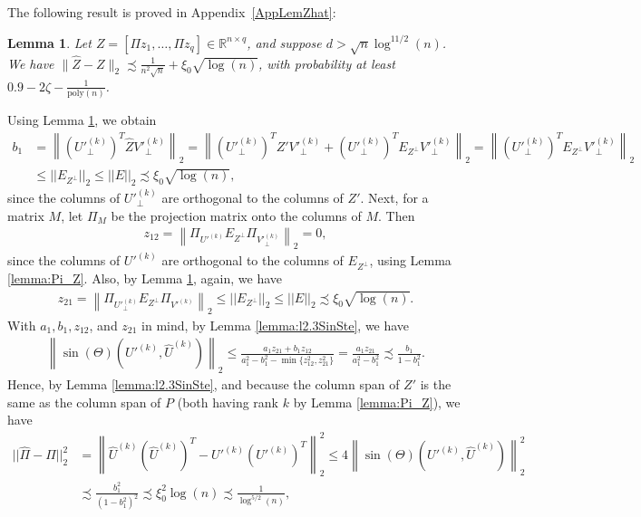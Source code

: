 \documentclass{article}
\newtheorem{lemma}{Lemma}
\begin{document}
The following result is proved in Appendix~\ref{AppLemZhat}: 

\begin{lemma}
\label{lemma:Zhat_Z}
Let $Z = [\Pi z_1, \dots, \Pi z_q] \in \mathbb{R}^{n \times q}$, and suppose $d > \sqrt{n}\log^{11/2}(n)$. We have $\|\hat{Z} - Z\|_2 \precsim \frac{1}{n^2\sqrt{n}} + \xi_0\sqrt{\log(n)}$, with probability at least $0.9 - 2\zeta - \frac{1}{\mathrm{poly}(n)}$.
\end{lemma}

Using Lemma \ref{lemma:Zhat_Z}, we obtain
\begin{align*}
b_1 &= \left\|(U'^{(k)}_{\perp})^T\hat{Z}V'^{(k)}_{\perp}\right\|_2 = \left\|(U'^{(k)}_{\perp})^TZ'V'^{(k)}_{\perp} + (U'^{(k)}_{\perp})^TE_{Z^{\perp}}V'^{(k)}_{\perp}\right\|_2 = \left\|(U'^{(k)}_{\perp})^TE_{Z^{\perp}}V'^{(k)}_{\perp}\right\|_2\\
&\leq ||E_{Z^{\perp}}||_2 \leq ||E||_2 \precsim \xi_0\sqrt{\log(n)},
\end{align*}
since the columns of $U'^{(k)}_{\perp}$ are orthogonal to the columns of $Z'$. Next, for a matrix $M$, let $\Pi_M$ be the projection matrix onto the columns of $M$. Then
\begin{align*}
z_{12} = \left\|\Pi_{U'^{(k)}}E_{Z^{\perp}}\Pi_{V'^{(k)}_{\perp}}\right\|_2 = 0,
\end{align*}
since the columns of $U'^{(k)}$ are orthogonal to the columns of $E_{Z^{\perp}}$, using Lemma \ref{lemma:Pi_Z}. Also, by Lemma \ref{lemma:Zhat_Z}, again, we have
\begin{align*}
z_{21} = \left\|\Pi_{U'^{(k)}_{\perp}}E_{Z^{\perp}}\Pi_{V'^{(k)}}\right\|_2 \leq ||E_{Z^{\perp}}||_2 \leq ||E||_2 \precsim \xi_0\sqrt{\log(n)}.
\end{align*}
With $a_1, b_1, z_{12}$, and $z_{21}$ in mind, by Lemma \ref{lemma:l2.3SinSte}, we have 
\begin{align*}
\left\|\sin(\Theta)(U'^{(k)}, \hat{U}^{(k)})\right\|_2 \leq \frac{a_1z_{21} + b_1z_{12}}{a_1^2 - b_1^2 - \min\{z_{12}^2, z_{21}^2\}} = \frac{a_1z_{21}}{a_1^2 - b_1^2} \precsim \frac{b_1}{1 - b_1^2}.
\end{align*}
Hence, by Lemma \ref{lemma:l2.3SinSte}, and because the column span of $Z'$ is the same as the column span of $P$ (both having rank $k$ by Lemma \ref{lemma:Pi_Z}), we have
\begin{align*}
||\hat{\Pi} - \Pi||_2^2 & = \left\|\hat{U}^{(k)}(\hat{U}^{(k)})^T - U'^{(k)}(U'^{(k)})^T\right\|_2^2 \leq 4\left\|\sin(\Theta)(U'^{(k)}, \hat{U}^{(k)})\right\|_2^2 \\
%
& \precsim \frac{b_1^2}{(1 - b_1^2)^2} \precsim \xi_0^2\log(n) \precsim \frac{1}{\log^{5/2}(n)},
\end{align*}
\end{document}
